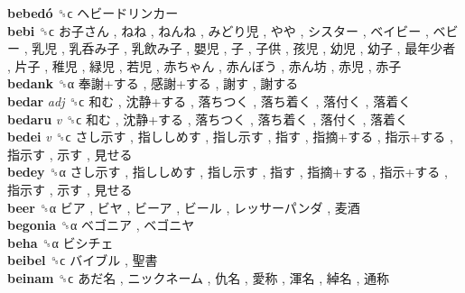 \textbf{bebedó} ␝ϲ   ヘビードリンカー   \\
\textbf{bebi} ␝ϲ   お子さん ,  ねね ,  ねんね ,  みどり児 ,  やや ,  シスター ,  ベイビー ,  ベビー ,  乳児 ,  乳呑み子 ,  乳飲み子 ,  嬰児 ,  子 ,  子供 ,  孩児 ,  幼児 ,  幼子 ,  最年少者 ,  片子 ,  稚児 ,  緑児 ,  若児 ,  赤ちゃん ,  赤んぼう ,  赤ん坊 ,  赤児 ,  赤子   \\
\textbf{bedank} ␝α   奉謝+する ,  感謝+する ,  謝す ,  謝する   \\
\textbf{bedar} \emph{adj}  ␝ϲ   和む ,  沈静+する ,  落ちつく ,  落ち着く ,  落付く ,  落着く   \\
\textbf{bedaru} \emph{v}  ␝ϲ   和む ,  沈静+する ,  落ちつく ,  落ち着く ,  落付く ,  落着く   \\
\textbf{bedei} \emph{v}  ␝ϲ   さし示す ,  指ししめす ,  指し示す ,  指す ,  指摘+する ,  指示+する ,  指示す ,  示す ,  見せる   \\
\textbf{bedey} ␝α   さし示す ,  指ししめす ,  指し示す ,  指す ,  指摘+する ,  指示+する ,  指示す ,  示す ,  見せる   \\
\textbf{beer} ␝α   ビア ,  ビヤ ,  ビーア ,  ビール ,  レッサーパンダ ,  麦酒   \\
\textbf{begonia} ␝α   ベゴニア ,  ベゴニヤ   \\
\textbf{beha} ␝α   ビシチェ   \\
\textbf{beibel} ␝ϲ   バイブル ,  聖書   \\
\textbf{beinam} ␝ϲ   あだ名 ,  ニックネーム ,  仇名 ,  愛称 ,  渾名 ,  綽名 ,  通称   \\
